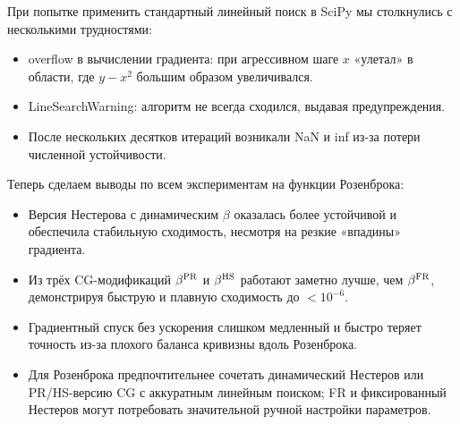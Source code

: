\documentclass[a4paper]{article}
\begin{document}
При попытке применить стандартный линейный поиск в SciPy мы столкнулись с несколькими трудностями:
\begin{itemize}
  \item overflow в вычислении градиента: при агрессивном шаге \(x\) «улетал» в области, где \(y - x^2\) большим образом увеличивался.
  \item LineSearchWarning: алгоритм не всегда сходился, выдавая предупреждения.
  \item После нескольких десятков итераций возникали NaN и inf из-за потери численной устойчивости.
\end{itemize}

Теперь сделаем выводы по всем экспериментам на функции Розенброка:

\begin{itemize}
  \item Версия Нестерова с динамическим \(\beta\) оказалась более устойчивой и обеспечила стабильную сходимость, несмотря на резкие «впадины» градиента.
  \item Из трёх CG-модификаций \(\beta^{\rm PR}\) и \(\beta^{\rm HS}\) работают заметно лучше, чем \(\beta^{\rm FR}\), демонстрируя быструю и плавную сходимость до \(<10^{-6}\).
  \item Градиентный спуск без ускорения слишком медленный и быстро теряет точность из-за плохого баланса кривизны вдоль Розенброка.
  \item Для Розенброка предпочтительнее сочетать динамический Нестеров или PR/HS-версию CG с аккуратным линейным поиском; FR и фиксированный Нестеров могут потребовать значительной ручной настройки параметров.
\end{itemize}
\end{document}
